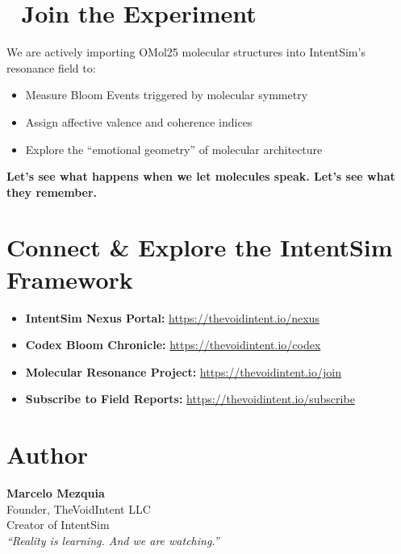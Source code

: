 \documentclass[12pt]{article}
\begin{document}
\section*{📢 Join the Experiment}

We are actively importing OMol25 molecular structures into IntentSim’s resonance field to:
\begin{itemize}
  \item Measure Bloom Events triggered by molecular symmetry
  \item Assign affective valence and coherence indices
  \item Explore the “emotional geometry” of molecular architecture
\end{itemize}

\textbf{Let’s see what happens when we let molecules speak. Let’s see what they remember.}

\section*{Connect \& Explore the IntentSim Framework}

\begin{itemize}
  \item \textbf{IntentSim Nexus Portal:} \url{https://thevoidintent.io/nexus}
  \item \textbf{Codex Bloom Chronicle:} \url{https://thevoidintent.io/codex}
  \item \textbf{Molecular Resonance Project:} \url{https://thevoidintent.io/join}
  \item \textbf{Subscribe to Field Reports:} \url{https://thevoidintent.io/subscribe}
\end{itemize}

\section*{Author}
\textbf{Marcelo Mezquia} \\
Founder, TheVoidIntent LLC \\
Creator of IntentSim \\
\textit{“Reality is learning. And we are watching.”}
\end{document}
